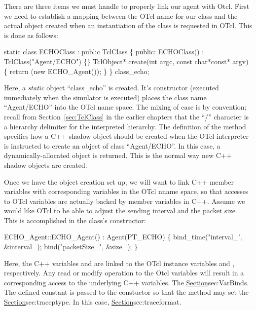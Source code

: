 There are three items we must handle to properly link our agent
with Otcl.
First we need to establish a mapping between the OTcl name
for our class and the actual object created when an
instantiation of the class is requested in OTcl.
This is done as follows:
\begin{program}
        static class ECHOClass : public TclClass \{
        public:
                ECHOClass() : TclClass("Agent/ECHO") \{\}
                TclObject* create(int argc, const char*const* argv) \{
                        return (new ECHO_Agent());
                \}
        \} class_echo;
\end{program}
Here, a {\em static} object ``class\_echo'' is created. It's constructor
(executed immediately when the simulator is executed) places the class name
``Agent/ECHO'' into the OTcl name space.
The mixing of case is by convention;
recall from Section~\ref{sec:TclClass} in the earlier chapters that
the ``/'' character is a hierarchy delimiter for the interpreted hierarchy.
The definition of the  method specifies how a C++
shadow object should be created when
the OTcl interpreter is instructed to create an
object of class ``Agent/ECHO''.  In this case, a dynamically-allocated
object is returned.  This is the normal way new C++ shadow objects
are created.

Once we have the object creation set up, we will want to link
C++ member variables with corresponding variables in the OTcl
nname space, so that accesses to OTcl variables are actually
backed by member variables in C++.
Assume we would like OTcl to be able to adjust the sending
interval and the packet size.
This is accomplished in the class's constructor:
\begin{program}
        ECHO_Agent::ECHO_Agent() : Agent(PT_ECHO)
        \{
                bind_time("interval_", &interval_);
                bind("packetSize_", &size_);
        \}
\end{program}
Here, the C++ variables  and  are
linked to the OTcl instance variables  and
, respectively.
Any read or modify operation to the Otcl variables will result
in a corresponding access to the underlying C++ variables.
The \href{details of the \fcn[]{bind} methods are described elsewhere}{%
        Section}{sec:VarBinds}.
The defined constant  is passed to the 
constuctor so that the  method may set
the \href{packet type field used by the trace support}{%
        Section}{sec:traceptype}.
In this case,  
\href{represents a new packet type and must be defined in \nsf{trace.h}}{%
        Section}{sec:traceformat}.

